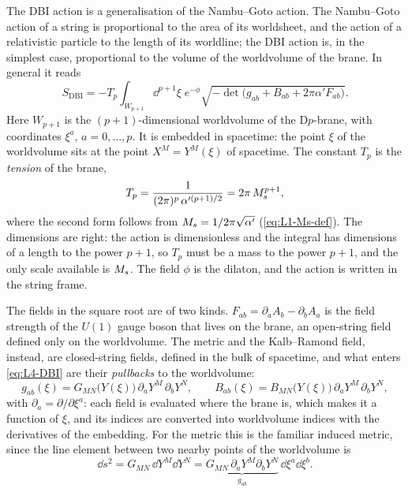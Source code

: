 The DBI action is a generalisation of the Nambu--Goto action. The Nambu--Goto action of a string is proportional to the area of its worldsheet, and the action of a relativistic particle to the length of its worldline; the DBI action is, in the simplest case, proportional to the volume of the worldvolume of the brane. In general it reads
\begin{equation}
  S_{\text{DBI}} = -T_p\int_{W_{p+1}}\dd^{p+1}\xi\;e^{-\phi}\sqrt{-\det\bigl(g_{ab} + B_{ab} + 2\pi\alpha'F_{ab}\bigr)} .
  \label{eq:L4-DBI}
\end{equation}
Here $W_{p+1}$ is the $(p+1)$-dimensional worldvolume of the D$p$-brane, with coordinates $\xi^a$, $a = 0,\dots,p$. It is embedded in spacetime: the point $\xi$ of the worldvolume sits at the point $X^M = Y^M(\xi)$ of spacetime. The constant $T_p$ is the \emph{tension} of the brane,
\begin{equation}
  T_p = \frac{1}{(2\pi)^p\,\alpha'^{(p+1)/2}} = 2\pi\,M_{s}^{p+1} ,
  \label{eq:L4-Tp}
\end{equation}
where the second form follows from $M_{s} = 1/2\pi\sqrt{\alpha'}$ (\cref{eq:L1-Ms-def}). The dimensions are right: the action is dimensionless and the integral has dimensions of a length to the power $p+1$, so $T_p$ must be a mass to the power $p+1$, and the only scale available is $M_{s}$. The field $\phi$ is the dilaton, and the action is written in the string frame.

The fields in the square root are of two kinds. $F_{ab} = \partial_aA_b - \partial_bA_a$ is the field strength of the $U(1)$ gauge boson that lives on the brane, an open-string field defined only on the worldvolume. The metric and the Kalb--Ramond field, instead, are closed-string fields, defined in the bulk of spacetime, and what enters \cref{eq:L4-DBI} are their \emph{pullbacks} to the worldvolume:
\begin{equation}
  g_{ab}(\xi) = G_{MN}\bigl(Y(\xi)\bigr)\,\partial_aY^M\,\partial_bY^N ,\qquad
  B_{ab}(\xi) = B_{MN}\bigl(Y(\xi)\bigr)\,\partial_aY^M\,\partial_bY^N ,
  \label{eq:L4-pullback}
\end{equation}
with $\partial_a = \partial/\partial\xi^a$: each field is evaluated where the brane is, which makes it a function of $\xi$, and its indices are converted into worldvolume indices with the derivatives of the embedding. For the metric this is the familiar induced metric, since the line element between two nearby points of the worldvolume is
\begin{equation}
  \dd s^2 = G_{MN}\,\dd Y^M\dd Y^N = \underbrace{G_{MN}\,\partial_aY^M\partial_bY^N}_{g_{ab}}\,\dd\xi^a\dd\xi^b .
  \label{eq:L4-induced}
\end{equation}

